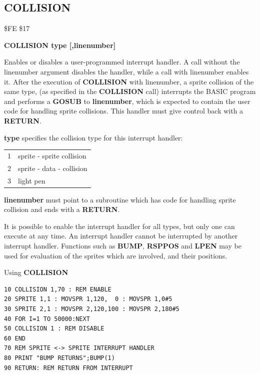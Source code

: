 \subsection{COLLISION}
\begin{description}[leftmargin=2cm,style=nextline]
\item [Token:] \$FE \$17
\item [Format:] {\bf COLLISION type [,linenumber]}
\item [Usage:]  Enables or disables
                a user-programmed interrupt handler.
                A call without the linenumber argument disables the handler,
                while a call with linenumber enables it.
                After the execution of {\bf COLLISION} with
                linenumber, a sprite collision of the same type,
                (as specified in the {\bf COLLISION} call)
                interrupts the BASIC program and performs a {\bf GOSUB}
                to {\bf linenumber}, which is expected to contain
                the user code for handling sprite collisions.
                This handler must give control back with a {\bf RETURN}.

                {\bf type} specifies the collision type for
                this interrupt handler:
                    \begin{longtable}{ c | l}
                    1	& 	sprite - sprite collision \\
                    2	& 	sprite - data - collision \\
                    3	& 	light pen \\
                    \end{longtable}

                {\bf linenumber} must point to a subroutine
                which has code for handling sprite collision
                and ends with a {\bf RETURN}.

\item [Remarks:] It is possible to enable the interrupt handler for
               all types, but only one can execute at any time.
               An interrupt handler cannot be interrupted by another
               interrupt handler.
               Functions such as {\bf BUMP}, {\bf RSPPOS} and
               {\bf LPEN} may be used for evaluation of the sprites
               which are involved, and their positions.

\item [Example:] Using {\bf COLLISION}
\begin{tcolorbox}[colback=black,coltext=white]
\verbatimfont{\codefont}
\begin{verbatim}
10 COLLISION 1,70 : REM ENABLE
20 SPRITE 1,1 : MOVSPR 1,120,  0 : MOVSPR 1,0#5
30 SPRITE 2,1 : MOVSPR 2,120,100 : MOVSPR 2,180#5
40 FOR I=1 TO 50000:NEXT
50 COLLISION 1 : REM DISABLE
60 END
70 REM SPRITE <-> SPRITE INTERRUPT HANDLER
80 PRINT "BUMP RETURNS";BUMP(1)
90 RETURN: REM RETURN FROM INTERRUPT
\end{verbatim}
\end{tcolorbox}
\end{description}

